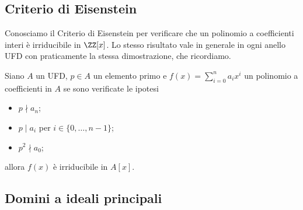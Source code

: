 \documentclass[11pt]{scrartcl}
\begin{document}
	\newpage
	
	\subsection{Criterio di Eisenstein}
	
	Conosciamo il Criterio di Eisenstein per verificare che un polinomio a coefficienti
	interi è irriducibile in $\ZZ[x]$. Lo stesso risultato vale in generale in 
	ogni anello UFD con praticamente la stessa dimostrazione, che ricordiamo.
	
	\begin{proposition}
		Siano $A$ un UFD, $p \in A$ un elemento primo e $f(x) = \displaystyle\sum_{i = 0}^n a_ix^i$
		un polinomio a coefficienti in $A$ se sono verificate le ipotesi
		\begin{itemize}
			\item $p \nmid a_n$;
			\item $p \mid a_i$ per $i \in \{0, \ldots, n - 1\}$;
			\item $p^2 \nmid a_0$;
		\end{itemize}
		allora $f(x)$ è irriducibile in $A[x]$.
	\end{proposition}
	
	
	\newpage
	
	\subsection{Domini a ideali principali}
	
\end{document}
